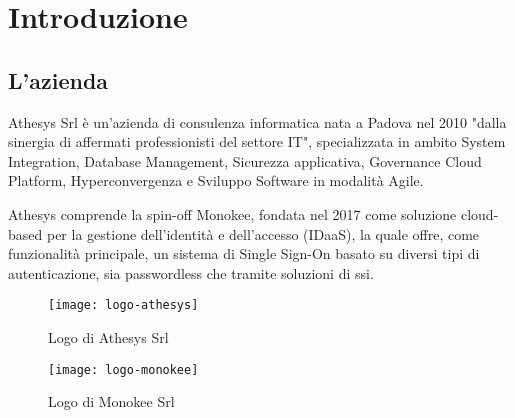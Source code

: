 
\chapter{Introduzione}
\label{cap:introduzione}






\section{L'azienda}

Athesys Srl è un'azienda di consulenza informatica nata a Padova nel 2010 "dalla sinergia di affermati professionisti del settore IT", specializzata in ambito System Integration, Database Management, Sicurezza applicativa, Governance Cloud Platform, Hyperconvergenza e
Sviluppo Software in modalità Agile.

Athesys comprende la spin-off Monokee, fondata nel 2017 come soluzione cloud-based per la gestione dell'identità
e dell'accesso (IDaaS), la quale offre, come funzionalità principale, un sistema di Single Sign-On basato 
su diversi tipi di autenticazione, sia passwordless che tramite soluzioni di \gls{ssi}.

\vspace{20pt}
\begin{figure}[!h] 
    \centering 
    \texttt{[image: logo-athesys]} 
    \caption{Logo di Athesys Srl}
\end{figure}

\begin{figure}[!h] 
    \centering 
    \texttt{[image: logo-monokee]} 
    \caption{Logo di Monokee Srl}
\end{figure}
    

